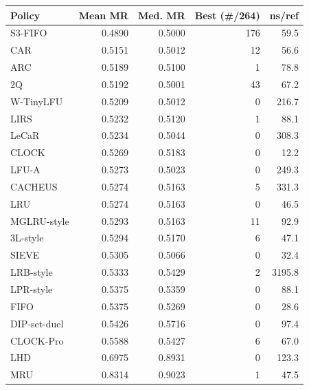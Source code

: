 \begin{tabular}{lrrrr}
\toprule
Policy & Mean MR & Med. MR & Best (\#/264) & ns/ref \\
\midrule
S3-FIFO & 0.4890 & 0.5000 & 176 & 59.5 \\
CAR & 0.5151 & 0.5012 & 12 & 56.6 \\
ARC & 0.5189 & 0.5100 & 1 & 78.8 \\
2Q & 0.5192 & 0.5001 & 43 & 67.2 \\
W-TinyLFU & 0.5209 & 0.5012 & 0 & 216.7 \\
LIRS & 0.5232 & 0.5120 & 1 & 88.1 \\
LeCaR & 0.5234 & 0.5044 & 0 & 308.3 \\
CLOCK & 0.5269 & 0.5183 & 0 & 12.2 \\
LFU-A & 0.5273 & 0.5023 & 0 & 249.3 \\
CACHEUS & 0.5274 & 0.5163 & 5 & 331.3 \\
LRU & 0.5274 & 0.5163 & 0 & 46.5 \\
MGLRU-style & 0.5293 & 0.5163 & 11 & 92.9 \\
3L-style & 0.5294 & 0.5170 & 6 & 47.1 \\
SIEVE & 0.5305 & 0.5066 & 0 & 32.4 \\
LRB-style & 0.5333 & 0.5429 & 2 & 3195.8 \\
LPR-style & 0.5375 & 0.5359 & 0 & 88.1 \\
FIFO & 0.5375 & 0.5269 & 0 & 28.6 \\
DIP-set-duel & 0.5426 & 0.5716 & 0 & 97.4 \\
CLOCK-Pro & 0.5588 & 0.5427 & 6 & 67.0 \\
LHD & 0.6975 & 0.8931 & 0 & 123.3 \\
MRU & 0.8314 & 0.9023 & 1 & 47.5 \\
\bottomrule
\end{tabular}
